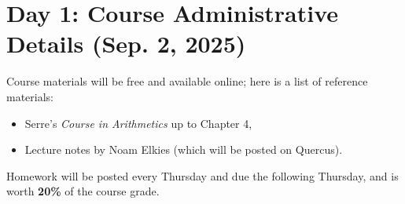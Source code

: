 \section{Day 1: Course Administrative Details (Sep. 2, 2025)}
Course materials will be free and available online; here is a list of reference materials:
\begin{itemize}
    \item Serre's \textit{Course in Arithmetics} up to Chapter 4,
    \item Lecture notes by Noam Elkies (which will be posted on Quercus).
\end{itemize}
Homework will be posted every Thursday and due the following Thursday, and is worth \textbf{20\%} of the course grade.